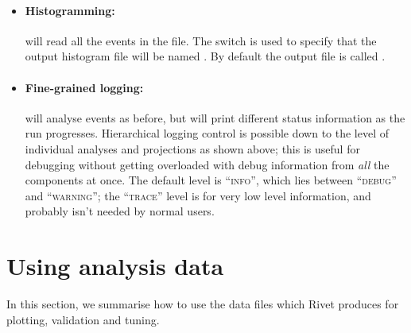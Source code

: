 \begin{itemize}

\item \paragraph{Histogramming:}{ will read all the
    events in the  file. The  switch is used to
    specify that the output histogram file will be named . By
    default the output file is called .}

\item \paragraph{Fine-grained logging:}{
    will analyse events as before, but will print different status
    information as the run progresses. Hierarchical logging control is possible
    down to the level of individual analyses and projections as shown above;
    this is useful for debugging without getting overloaded with debug
    information from \emph{all} the components at once. The default level is
    ``\textsc{info}'', which lies between ``\textsc{debug}'' and
    ``\textsc{warning}''; the ``\textsc{trace}'' level is for very low level
    information, and probably isn't needed by normal users.}

\end{itemize}



\section{Using analysis data}

In this section, we summarise how to use the data files which Rivet produces for
plotting, validation and tuning.

